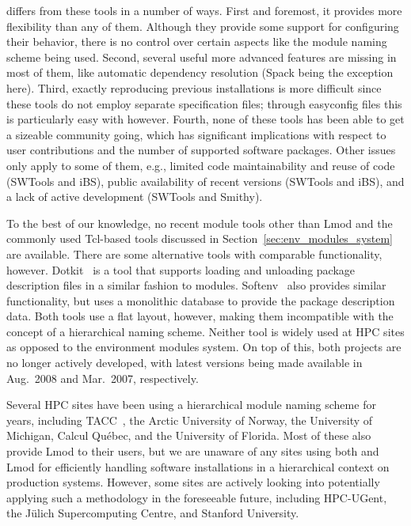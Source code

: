 \easybuild{} differs from these tools in a number of ways. First and foremost, it
provides more flexibility than any of them. Although they provide some support
for configuring their behavior, there is no control over certain aspects like the
module naming scheme being used. Second, several useful more advanced
features are missing in most of them, like automatic dependency resolution (Spack
being the exception here). Third, exactly reproducing previous installations is more
difficult since these tools do not employ separate specification files; through
easyconfig files this is particularly easy with \easybuild{} however.
Fourth, none of these tools has been able to get a sizeable community going, which
has significant implications with respect to user contributions and the number of supported
software packages.
Other issues only apply to some of them, e.g., limited code
maintainability and reuse of code (SWTools and iBS), public availability of recent
versions (SWTools and iBS), and a lack of active development (SWTools and Smithy).

To the best of our knowledge, no recent module tools other than Lmod and the commonly
used Tcl-based tools discussed in Section~\ref{sec:env_modules_system} are
available. There are some alternative tools with comparable functionality, however.
Dotkit~\cite{dotkit} is a tool that supports loading and unloading package description 
files in a similar fashion to modules. Softenv~\cite{softenv} also provides similar
functionality, but uses a monolithic database to provide the package description data.
Both tools use a flat layout, however, making them incompatible with the concept of a
hierarchical naming scheme. Neither tool is widely used at HPC sites as
opposed to the environment modules system. On top of this, both projects are no longer
actively developed, with latest versions being made available in Aug.~2008 and
Mar.~2007, respectively.

Several HPC sites have been using a hierarchical module naming scheme for years,
including TACC~\cite{lmodSC11}, the Arctic University of Norway, the University
of Michigan, Calcul Qu\'ebec, and the University of Florida. Most of these also provide
Lmod to their users, but we are unaware of any sites using both \easybuild{} and Lmod
for efficiently handling software installations in a hierarchical context on
production systems. However, some
sites are actively looking into potentially applying such a methodology in the
foreseeable future, including HPC-UGent, the J\"ulich Supercomputing Centre, and
Stanford University.
